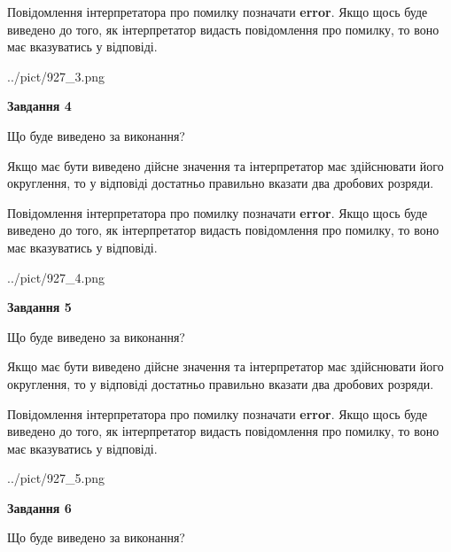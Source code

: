 \documentclass[12pt, ukrainian]{article}
\begin{document}
{\begin {Large}
Повідомлення інтерпретатора про помилку позначати \textbf{error}.
Якщо щось буде виведено до того, як інтерпретатор видасть повідомлення про помилку, 
то воно має вказуватись у відповіді. \par

\begin{center}
	{../pict/927_3.png}
\end{center}
\newpage

{\begin {center}\textbf{Завдання 4}\end {center}}\par
Що буде виведено за виконання? \par

Якщо має бути виведено дійсне значення та інтерпретатор має здійснювати його округлення, 
то у відповіді достатньо правильно вказати два дробових розряди.

Повідомлення інтерпретатора про помилку позначати \textbf{error}.
Якщо щось буде виведено до того, як інтерпретатор видасть повідомлення про помилку, 
то воно має вказуватись у відповіді. \par

\begin{center}
	{../pict/927_4.png}
\end{center}
\newpage

{\begin {center}\textbf{Завдання 5}\end {center}}\par
Що буде виведено за виконання? \par

Якщо має бути виведено дійсне значення та інтерпретатор має здійснювати його округлення, 
то у відповіді достатньо правильно вказати два дробових розряди.

Повідомлення інтерпретатора про помилку позначати \textbf{error}.
Якщо щось буде виведено до того, як інтерпретатор видасть повідомлення про помилку, 
то воно має вказуватись у відповіді. \par

\begin{center}
	{../pict/927_5.png}
\end{center}
\newpage

{\begin {center}\textbf{Завдання 6}\end {center}}\par
Що буде виведено за виконання? \par


\end{Large}}
\end{document}
